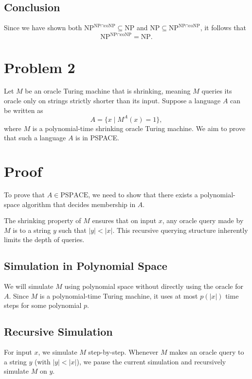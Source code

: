 \documentclass{article}
\begin{document}
\subsection*{Conclusion}

Since we have shown both \(\text{NP}^{\text{NP} \cap \text{coNP}} \subseteq \text{NP}\) and \(\text{NP} \subseteq \text{NP}^{\text{NP} \cap \text{coNP}}\), it follows that
\[
\text{NP}^{\text{NP} \cap \text{coNP}} = \text{NP}.
\]
\pagebreak


\section{Problem 2}
Let \( M \) be an oracle Turing machine that is shrinking, meaning \( M \) queries its oracle only on strings strictly shorter than its input. Suppose a language \( A \) can be written as
\[ A = \{ x \mid M^A(x) = 1 \}, \]
where \( M \) is a polynomial-time shrinking oracle Turing machine. We aim to prove that such a language \( A \) is in PSPACE.

\section*{Proof}

To prove that \( A \in \text{PSPACE} \), we need to show that there exists a polynomial-space algorithm that decides membership in \( A \).

The shrinking property of \( M \) ensures that on input \( x \), any oracle query made by \( M \) is to a string \( y \) such that \( |y| < |x| \). This recursive querying structure inherently limits the depth of queries.

\subsection*{Simulation in Polynomial Space}

We will simulate \( M \) using polynomial space without directly using the oracle for \( A \). Since \( M \) is a polynomial-time Turing machine, it uses at most \( p(|x|) \) time steps for some polynomial \( p \).

\subsection*{Recursive Simulation}

For input \( x \), we simulate \( M \) step-by-step. Whenever \( M \) makes an oracle query to a string \( y \) (with \( |y| < |x| \)), we pause the current simulation and recursively simulate \( M \) on \( y \).
\end{document}
